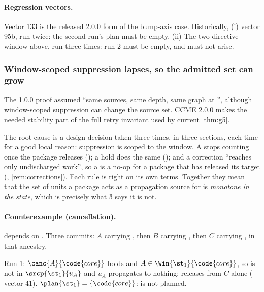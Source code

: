 \paragraph{Regression vectors.} Vector 133 is the released 2.0.0 form of the bump-axis case. Historically, (i) vector 95b, run twice: the second run's plan
must be empty. (ii) The two-directive window above, run three times: run 2 must
be empty, and  must not arise.

\subsubsection{Window-scoped suppression lapses, so the admitted set can grow}

\begin{obligation}
\label{ob:g5}
The 1.0.0 proof assumed ``same sources, same depth, same graph at \Head{}'', although window-scoped suppression can change the source set. CCME 2.0.0 makes the needed stability part of the full retry invariant used by current \cref{thm:g5}.
\end{obligation}

The root cause is a design decision taken three times, in three sections, each
time for a good local reason: suppression is scoped to the window. A
 stops counting once the package releases (); a hold
does the same (); and a correction ``reaches only undischarged
work'', so a  is a no-op for a package that has released its
target (, \cref{rem:corrections}). Each rule is right on its own
terms. Together they mean that the set of units a package acts as a propagation
source for is \emph{monotone in the state}, which is precisely what \G{5} says
it is not.

\paragraph{Counterexample (cancellation).}  depends on .
Three commits: $A$ carrying , then $B$
carrying , then $C$ carrying , in
that ancestry.

Run 1: $\canc{A}{\code{core}}$ holds and $A \in \Win{\st_1}{\code{core}}$, so
 is not in $\srcp{\st_1}{u_A}$ and $u_A$ propagates to nothing;
 releases  from $C$ alone (\SPEC{} vector 41).
$\plan{\st_1} = \{\code{core}\}$:  is not planned.

